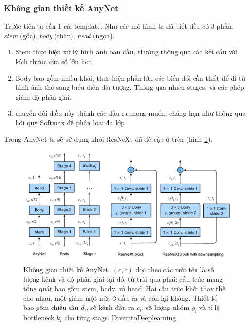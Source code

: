 \documentclass{article}
\begin{document}
\subsubsection{Không gian thiết kế AnyNet}
Trước tiên ta cần 1 cái template. Như các mô hình ta đã biết đều có 3 phần: \textit{stem} (gốc), \textit{body} (thân), \textit{head} (ngọn).
\begin{enumerate}
    \item Stem thực hiện xử lý hình ảnh ban đầu, thường thông qua các kết cấu với kích thước cửa sổ lớn hơn
    \item Body bao gồm nhiều khối, thực hiện phần lớn các biến đổi cần thiết để đi từ hình ảnh thô sang biểu diễn đối tượng. Thông qua nhiều stages, và các phép giảm độ phân giải.
    \item chuyển đổi điều này thành các đầu ra mong muốn, chẳng hạn như thông qua hồi quy Softmax để phân loại đa lớp
\end{enumerate}
Trong AnyNet ta sẽ sử dụng khối ResNeXt đã đề cập ở trên (hình \ref{fig20}).
\begin{figure}
    \centering
    \includegraphics[width = 0.7\linewidth]{anynet.pdf}
    \caption{Không gian thiết kế AnyNet. $(c,r)$ dọc theo các mũi tên là số lượng kênh và độ phân giải tại đó. từ trái qua phải: cấu trúc mạng tổng quát bao gồm stem, body, và head. Hai cấu trúc khối thay thế cho nhau, một giảm một nửa ở đầu ra và còn lại không. Thiết kế bao gồm chiều sâu $d_i$, số kênh đầu ra $c_i$, số lượng nhóm $g_i$ và tỉ lệ bottleneck $k_i$ cho từng stage. DiveintoDeeplearning}
    \label{fig20}
\end{figure}
\end{document}

